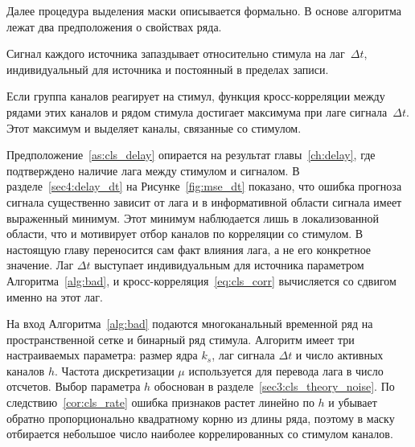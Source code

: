 Далее процедура выделения маски описывается формально. В основе алгоритма лежат два предположения о свойствах ряда.

\begin{assumption}\label{as:cls_delay}
Сигнал каждого источника запаздывает относительно стимула на лаг~$\Delta t$, индивидуальный для источника и постоянный в пределах записи.
\end{assumption}

\begin{assumption}\label{as:cls_peak}
Если группа каналов реагирует на стимул, функция кросс-корреляции между рядами этих каналов и рядом стимула достигает максимума при лаге сигнала~$\Delta t$. Этот максимум и выделяет каналы, связанные со стимулом.
\end{assumption}

Предположение~\ref{as:cls_delay} опирается на результат главы~\ref{ch:delay}, где подтверждено наличие лага между стимулом и сигналом. В разделе~\ref{sec4:delay_dt} на Рисунке~\ref{fig:mse_dt} показано, что ошибка прогноза сигнала существенно зависит от лага и в информативной области сигнала имеет выраженный минимум. Этот минимум наблюдается лишь в локализованной области, что и мотивирует отбор каналов по корреляции со стимулом. В настоящую главу переносится сам факт влияния лага, а не его конкретное значение. Лаг $\Delta t$ выступает индивидуальным для источника параметром Алгоритма~\ref{alg:bad}, и кросс-корреляция~\eqref{eq:cls_corr} вычисляется со сдвигом именно на этот лаг.

На вход Алгоритма~\ref{alg:bad} подаются многоканальный временной ряд на пространственной сетке и бинарный ряд стимула. Алгоритм имеет три настраиваемых параметра: размер ядра $k_s$, лаг сигнала $\Delta t$ и число активных каналов $h$. Частота дискретизации $\mu$ используется для перевода лага в число отсчетов. Выбор параметра $h$ обоснован в разделе~\ref{sec3:cls_theory_noise}. По следствию~\ref{cor:cls_rate} ошибка признаков растет линейно по $h$ и убывает обратно пропорционально квадратному корню из длины ряда, поэтому в маску отбирается небольшое число наиболее коррелированных со стимулом каналов.

